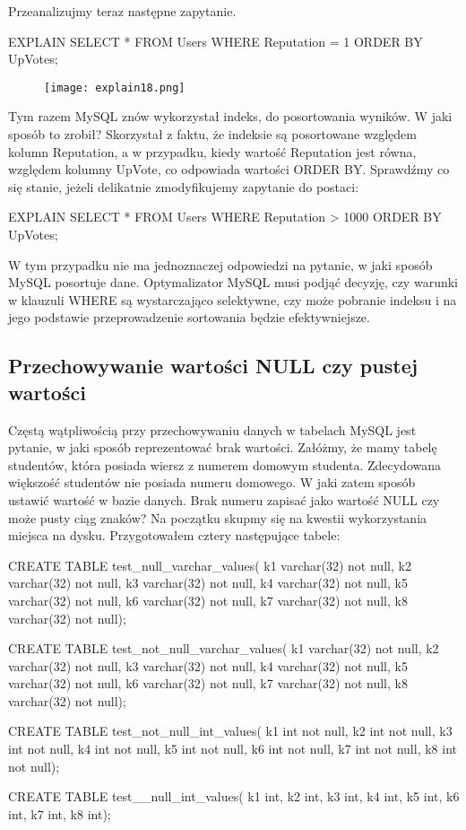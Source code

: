 Przeanalizujmy teraz następne zapytanie.

\begin{spverbatim}
	EXPLAIN SELECT * FROM Users WHERE Reputation = 1 ORDER BY UpVotes;
\end{spverbatim}
\begin{figure}[H]
	\texttt{[image: explain18.png]} 
\end{figure}
Tym razem MySQL znów wykorzystał indeks, do posortowania wyników. W jaki sposób to zrobił? 
Skorzystał z faktu, że indeksie są posortowane względem kolumn Reputation, a w przypadku, kiedy wartość Reputation jest równa, względem kolumny UpVote, co odpowiada wartości ORDER BY.
Sprawdźmy co się stanie, jeżeli delikatnie zmodyfikujemy zapytanie do postaci:
\begin{spverbatim}
	EXPLAIN SELECT * FROM Users WHERE Reputation > 1000 ORDER BY UpVotes;
\end{spverbatim}

W tym przypadku nie ma jednoznaczej odpowiedzi na pytanie, w jaki sposób MySQL posortuje dane. Optymalizator MySQL musi podjąć decyzję, czy warunki w klauzuli WHERE są wystarczająco selektywne, czy może pobranie indeksu i na jego podstawie przeprowadzenie sortowania będzie efektywniejsze.

\subsection{Przechowywanie wartości NULL czy pustej wartości}
Częstą wątpliwością przy przechowywaniu danych w tabelach MySQL jest pytanie, w jaki sposób reprezentować brak wartości. Załóżmy, że mamy tabelę studentów, która posiada wiersz z numerem domowym studenta. Zdecydowana większość studentów nie posiada numeru domowego. W jaki zatem sposób ustawić wartość w bazie danych. Brak numeru zapisać jako wartość NULL czy może pusty ciąg znaków? Na początku skupmy się na kwestii wykorzystania miejsca na dysku. Przygotowałem cztery następujące tabele:

\begin{spverbatim}
	CREATE TABLE test_null_varchar_values(
	k1 varchar(32) not null, k2 varchar(32) not null,
	k3 varchar(32) not null, k4 varchar(32) not null,
	k5 varchar(32) not null, k6 varchar(32) not null,
	k7 varchar(32) not null, k8 varchar(32) not null);
	
	CREATE TABLE test_not_null_varchar_values(
	k1 varchar(32) not null, k2 varchar(32) not null,
	k3 varchar(32) not null, k4 varchar(32) not null,
	k5 varchar(32) not null, k6 varchar(32) not null,
	k7 varchar(32) not null, k8 varchar(32) not null);
	
	CREATE TABLE test_not_null_int_values(
	k1 int not null, k2 int not null,
	k3 int not null, k4 int not null,
	k5 int not null, k6 int not null,
	k7 int not null, k8 int not null);
	
	CREATE TABLE test__null_int_values(
	k1 int,	k2 int,	k3 int, k4 int,
	k5 int,	k6 int,	k7 int,	k8 int);
	
\end{spverbatim}

